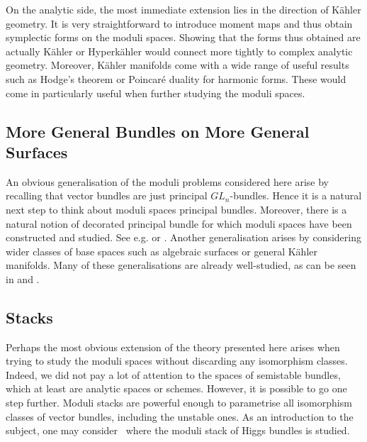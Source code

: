 \documentclass[12pt]{ociamthesis}  %
\begin{document}
On the analytic side, the most immediate extension lies in the
direction of K\"ahler geometry.
It is very straightforward to introduce moment maps and thus obtain
symplectic forms on the moduli spaces. Showing that the forms thus
obtained are actually K\"ahler or Hyperk\"ahler would connect more
tightly to complex analytic geometry. Moreover, K\"ahler manifolds
come with a wide range of useful results such as Hodge's theorem
or Poincar\'e duality for harmonic forms. These would come in
particularly useful when further studying the moduli spaces.

\subsection{More General Bundles on More General Surfaces}

An obvious generalisation of the moduli problems considered here
arise by recalling that vector bundles are just principal
$GL_n$-bundles. Hence it is a natural next step to think about
moduli spaces principal bundles. Moreover, there is a natural
notion of decorated principal bundle for which moduli spaces have
been constructed and studied. See e.g.
\cite[Section 4.B]{huybrechts2010} or \cite{schmitt2004}.
Another generalisation arises by considering wider classes
of base spaces such as algebraic surfaces or general K\"ahler
manifolds. Many of these generalisations are already well-studied,
as can be seen in \cite{huybrechts2010} and \cite{kobayashi1987}.

\subsection{Stacks}

Perhaps the most obvious extension of the theory presented here
arises when trying to study the moduli spaces without discarding
any isomorphism classes. Indeed, we did not pay a lot
of attention to the spaces of semistable bundles, which at least
are analytic spaces or schemes. However, it is possible to go one
step further. Moduli stacks are powerful enough to parametrise
all isomorphism classes of vector bundles, including the unstable ones.
As an introduction to the subject, one may consider~\cite{cm2017} where the moduli stack of Higgs bundles is studied.

\pagebreak
\renewcommand{\bibname}{References}
\printbibliography
\end{document}
